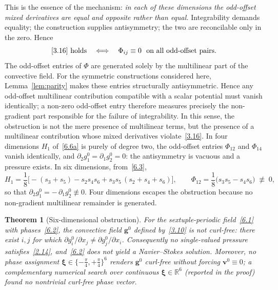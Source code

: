 \documentclass[11pt]{jfm}
\newtheorem{theorem}[lemma]{Theorem}
\numberwithin{equation}{section}
\begin{document}
This is the essence of the mechanism: \emph{in each of these dimensions the odd-offset
mixed derivatives are equal and opposite rather than equal.} Integrability demands equality;
the construction supplies antisymmetry; the two are reconcilable only in the zero. Hence
\begin{equation}
\label{6.9}
\text{\eqref{3.16} holds}
\quad\Longleftrightarrow\quad
\Phi_{ij}\equiv0 \ \text{ on all odd-offset pairs} .
\end{equation}
The odd-offset entries of $\Phi$ are generated solely by the multilinear
part of the convective field. For the symmetric constructions considered
here, Lemma~\ref{lem:parity} makes these entries structurally antisymmetric.
Hence any odd-offset multilinear contribution compatible with a scalar
potential must vanish identically; a non-zero odd-offset entry therefore
measures precisely the non-gradient part responsible for the failure of
integrability. In this sense, the obstruction is not the mere presence of
multilinear terms, but the presence of a multilinear contribution whose
mixed derivatives violate~\eqref{3.16}.
In four dimensions $H_1$ of~\eqref{6.6a} is purely of degree two, the odd-offset entries
$\Phi_{12}$ and $\Phi_{14}$ vanish identically, and $\partial_2 g_1^0=\partial_1 g_2^0=0$: the
antisymmetry is vacuous and a pressure exists. In six dimensions, from~\eqref{6.3},
\begin{equation}
\label{6.10}
H_1 = \frac18\Big[-(s_3+s_5) - s_2s_4s_6 + s_3s_5\,(s_2+s_4+s_6)\Big],
\qquad
\Phi_{12} = \frac18\bigl(s_3s_5-s_4s_6\bigr) \;\not\equiv\; 0,
\end{equation}
so that $\partial_2 g_1^0=-\,\partial_1 g_2^0\not\equiv0$. Four dimensions escapes the obstruction
because no non-gradient multilinear remainder is generated.

\begin{theorem}[Six-dimensional obstruction]
\label{thm:6D}
For the sextuple-periodic field~\eqref{6.1} with phases~\eqref{6.2}, the convective field
$\boldsymbol{g}^0$ defined by~\eqref{3.10} is not curl-free: there exist $i,j$ for which
$\partial g_i^0/\partial x_j \neq \partial g_j^0/\partial x_i$. Consequently no single-valued
pressure satisfies~\eqref{2.14}, and~\eqref{6.2} does not yield a Navier--Stokes solution.
Moreover, no phase assignment $\boldsymbol{\xi}\in\{-\tfrac{\pi}{4},+\tfrac{\pi}{4}\}^6$ renders
$\boldsymbol{g}^0$ curl-free without forcing $\boldsymbol{v}^0\equiv 0$; a complementary numerical search over continuous $\boldsymbol{\xi}\in\mathbb{R}^6$ (reported in the proof) found no nontrivial curl-free phase vector.
\end{theorem}
\end{document}
